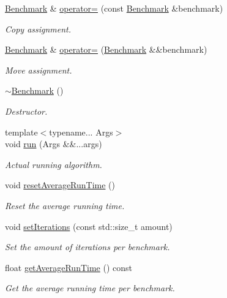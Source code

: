 \begin{DoxyCompactItemize}
\hyperlink{classttl_1_1_benchmark}{Benchmark} \& \hyperlink{classttl_1_1_benchmark_a69ee7dbcce5b20e84531efcb45798b51}{operator=} (const \hyperlink{classttl_1_1_benchmark}{Benchmark} \&benchmark)
\begin{DoxyCompactList}\small\item\em Copy assignment. \end{DoxyCompactList}\item 
\hyperlink{classttl_1_1_benchmark}{Benchmark} \& \hyperlink{classttl_1_1_benchmark_a1d7327984894e6ffce05d70836727e2c}{operator=} (\hyperlink{classttl_1_1_benchmark}{Benchmark} \&\&benchmark)
\begin{DoxyCompactList}\small\item\em Move assignment. \end{DoxyCompactList}\item 
\hypertarget{classttl_1_1_benchmark_a194cd9074f96736102831fa818d890a3}{\hyperlink{classttl_1_1_benchmark_a194cd9074f96736102831fa818d890a3}{$\sim$\-Benchmark} ()}\label{classttl_1_1_benchmark_a194cd9074f96736102831fa818d890a3}

\begin{DoxyCompactList}\small\item\em Destructor. \end{DoxyCompactList}\item 
{\footnotesize template$<$typename... Args$>$ }\\void \hyperlink{classttl_1_1_benchmark_a5739a5a9d2634d4b74676b70166ef9e1}{run} (Args \&\&...args)
\begin{DoxyCompactList}\small\item\em Actual running algorithm. \end{DoxyCompactList}\item 
\hypertarget{classttl_1_1_benchmark_aa24491ab2be4d5d9790883b6c3dde656}{void \hyperlink{classttl_1_1_benchmark_aa24491ab2be4d5d9790883b6c3dde656}{reset\-Average\-Run\-Time} ()}\label{classttl_1_1_benchmark_aa24491ab2be4d5d9790883b6c3dde656}

\begin{DoxyCompactList}\small\item\em Reset the average running time. \end{DoxyCompactList}\item 
\hypertarget{classttl_1_1_benchmark_a8135ff02ee37bf040b7cb10aa949adf7}{void \hyperlink{classttl_1_1_benchmark_a8135ff02ee37bf040b7cb10aa949adf7}{set\-Iterations} (const std\-::size\-\_\-t amount)}\label{classttl_1_1_benchmark_a8135ff02ee37bf040b7cb10aa949adf7}

\begin{DoxyCompactList}\small\item\em Set the amount of iterations per benchmark. \end{DoxyCompactList}\item 
float \hyperlink{classttl_1_1_benchmark_ade766a7dd34bbca7039635818edc5a55}{get\-Average\-Run\-Time} () const 
\begin{DoxyCompactList}\small\item\em Get the average running time per benchmark. \end{DoxyCompactList}\end{DoxyCompactItemize}
